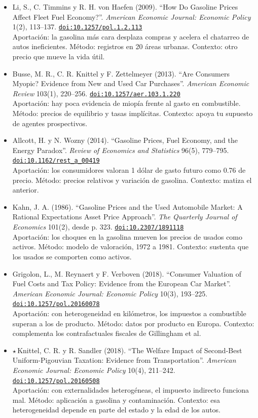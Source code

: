 \documentclass[11pt]{article}
\begin{document}
\begin{itemize}
\item Li, S., C. Timmins y R. H. von Haefen (2009). ``How Do Gasoline Prices Affect Fleet Fuel Economy?''. \textit{American Economic Journal: Economic Policy} 1(2), 113--137. \href{https://doi.org/10.1257/pol.1.2.113}{\texttt{doi:10.1257/pol.1.2.113}}\\
Aportación: la gasolina más cara desplaza compras y acelera el chatarreo de autos ineficientes. Método: registros en 20 áreas urbanas. Contexto: otro precio que mueve la vida útil.
\item Busse, M. R., C. R. Knittel y F. Zettelmeyer (2013). ``Are Consumers Myopic? Evidence from New and Used Car Purchases''. \textit{American Economic Review} 103(1), 220--256. \href{https://doi.org/10.1257/aer.103.1.220}{\texttt{doi:10.1257/aer.103.1.220}}\\
Aportación: hay poca evidencia de miopía frente al gasto en combustible. Método: precios de equilibrio y tasas implícitas. Contexto: apoya tu supuesto de agentes prospectivos.
\item Allcott, H. y N. Wozny (2014). ``Gasoline Prices, Fuel Economy, and the Energy Paradox''. \textit{Review of Economics and Statistics} 96(5), 779--795. \href{https://doi.org/10.1162/rest\_a\_00419}{\texttt{doi:10.1162/rest\_a\_00419}}\\
Aportación: los consumidores valoran 1 dólar de gasto futuro como 0.76 de precio. Método: precios relativos y variación de gasolina. Contexto: matiza el anterior.
\item Kahn, J. A. (1986). ``Gasoline Prices and the Used Automobile Market: A Rational Expectations Asset Price Approach''. \textit{The Quarterly Journal of Economics} 101(2), desde p. 323. \href{https://doi.org/10.2307/1891118}{\texttt{doi:10.2307/1891118}}\\
Aportación: los choques en la gasolina mueven los precios de usados como activos. Método: modelo de valoración, 1972 a 1981. Contexto: sustenta que los usados se comporten como activos.
\item Grigolon, L., M. Reynaert y F. Verboven (2018). ``Consumer Valuation of Fuel Costs and Tax Policy: Evidence from the European Car Market''. \textit{American Economic Journal: Economic Policy} 10(3), 193--225. \href{https://doi.org/10.1257/pol.20160078}{\texttt{doi:10.1257/pol.20160078}}\\
Aportación: con heterogeneidad en kilómetros, los impuestos a combustible superan a los de producto. Método: datos por producto en Europa. Contexto: complementa los contrafactuales fiscales de Gillingham et al.
\item $\star$\,Knittel, C. R. y R. Sandler (2018). ``The Welfare Impact of Second-Best Uniform-Pigouvian Taxation: Evidence from Transportation''. \textit{American Economic Journal: Economic Policy} 10(4), 211--242. \href{https://doi.org/10.1257/pol.20160508}{\texttt{doi:10.1257/pol.20160508}}\\
Aportación: con externalidades heterogéneas, el impuesto indirecto funciona mal. Método: aplicación a gasolina y contaminación. Contexto: esa heterogeneidad depende en parte del estado y la edad de los autos.
\end{itemize}
\end{document}
